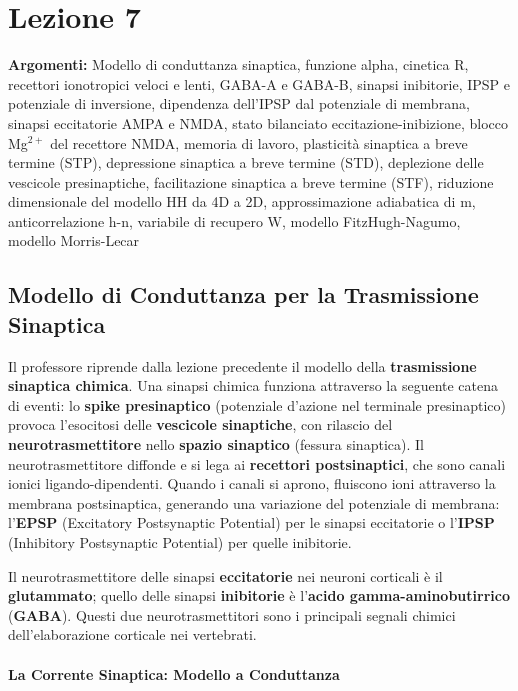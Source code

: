 \chapter{Lezione 7 }


\textbf{Argomenti:} Modello di conduttanza sinaptica, funzione alpha, cinetica R, recettori ionotropici veloci e lenti, GABA-A e GABA-B, sinapsi inibitorie, IPSP e potenziale di inversione, dipendenza dell'IPSP dal potenziale di membrana, sinapsi eccitatorie AMPA e NMDA, stato bilanciato eccitazione-inibizione, blocco Mg$^{2+}$ del recettore NMDA, memoria di lavoro, plasticità sinaptica a breve termine (STP), depressione sinaptica a breve termine (STD), deplezione delle vescicole presinaptiche, facilitazione sinaptica a breve termine (STF), riduzione dimensionale del modello HH da 4D a 2D, approssimazione adiabatica di m, anticorrelazione h-n, variabile di recupero W, modello FitzHugh-Nagumo, modello Morris-Lecar



\section{Modello di Conduttanza per la Trasmissione Sinaptica}


Il professore riprende dalla lezione precedente il modello della \textbf{trasmissione sinaptica chimica}. Una sinapsi chimica funziona attraverso la seguente catena di eventi: lo \textbf{spike presinaptico} (potenziale d'azione nel terminale presinaptico) provoca l'esocitosi delle \textbf{vescicole sinaptiche}, con rilascio del \textbf{neurotrasmettitore} nello \textbf{spazio sinaptico} (fessura sinaptica). Il neurotrasmettitore diffonde e si lega ai \textbf{recettori postsinaptici}, che sono canali ionici ligando-dipendenti. Quando i canali si aprono, fluiscono ioni attraverso la membrana postsinaptica, generando una variazione del potenziale di membrana: l'\textbf{EPSP} (Excitatory Postsynaptic Potential) per le sinapsi eccitatorie o l'\textbf{IPSP} (Inhibitory Postsynaptic Potential) per quelle inibitorie.

Il neurotrasmettitore delle sinapsi \textbf{eccitatorie} nei neuroni corticali è il \textbf{glutammato}; quello delle sinapsi \textbf{inibitorie} è l'\textbf{acido gamma-aminobutirrico} (\textbf{GABA}). Questi due neurotrasmettitori sono i principali segnali chimici dell'elaborazione corticale nei vertebrati.

\subsubsection{La Corrente Sinaptica: Modello a Conduttanza}

